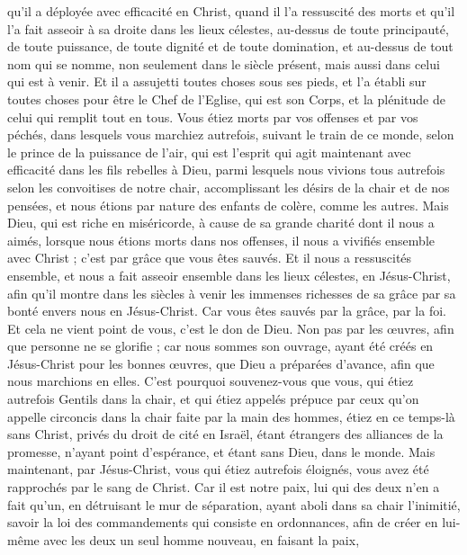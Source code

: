 \begin{multicols}{2}
qu'il a déployée avec efficacité en Christ, quand il l'a ressuscité des morts et qu'il l'a fait asseoir à sa droite dans les lieux célestes,
au-dessus de toute principauté, de toute puissance, de toute dignité et de toute domination, et au-dessus de tout nom qui se nomme, non seulement dans le siècle présent, mais aussi dans celui qui est à venir.
Et il a assujetti toutes choses sous ses pieds, et l'a établi sur toutes choses pour être le Chef de l'Eglise,
qui est son Corps, et la plénitude de celui qui remplit tout en tous.
\VerseOne{}Vous étiez morts par vos offenses et par vos péchés,
dans lesquels vous marchiez autrefois, suivant le train de ce monde, selon le prince de la puissance de l'air, qui est l'esprit qui agit maintenant avec efficacité dans les fils rebelles à Dieu,
parmi lesquels nous vivions tous autrefois selon les convoitises de notre chair, accomplissant les désirs de la chair et de nos pensées, et nous étions par nature des enfants de colère, comme les autres.
Mais Dieu, qui est riche en miséricorde, à cause de sa grande charité dont il nous a aimés,
lorsque nous étions morts dans nos offenses, il nous a vivifiés ensemble avec Christ ; c'est par grâce que vous êtes sauvés.
Et il nous a ressuscités ensemble, et nous a fait asseoir ensemble dans les lieux célestes, en Jésus-Christ,
afin qu'il montre dans les siècles à venir les immenses richesses de sa grâce par sa bonté envers nous en Jésus-Christ.
Car vous êtes sauvés par la grâce, par la foi. Et cela ne vient point de vous, c'est le don de Dieu.
Non pas par les œuvres, afin que personne ne se glorifie ;
car nous sommes son ouvrage, ayant été créés en Jésus-Christ pour les bonnes œuvres, que Dieu a préparées d'avance, afin que nous marchions en elles.
C’est pourquoi souvenez-vous que vous, qui étiez autrefois Gentils dans la chair, et qui étiez appelés prépuce par ceux qu'on appelle circoncis dans la chair faite par la main des hommes, 
étiez en ce temps-là sans Christ, privés du droit de cité en Israël, étant étrangers des alliances de la promesse, n'ayant point d'espérance, et étant sans Dieu, dans le monde.
Mais maintenant, par Jésus-Christ, vous qui étiez autrefois éloignés, vous avez été rapprochés par le sang de Christ.
Car il est notre paix, lui qui des deux n'en a fait qu'un, en détruisant le mur de séparation,
ayant aboli dans sa chair l'inimitié, savoir la loi des commandements qui consiste en ordonnances, afin de créer en lui-même avec les deux un seul homme nouveau, en faisant la paix,

\end{multicols}

